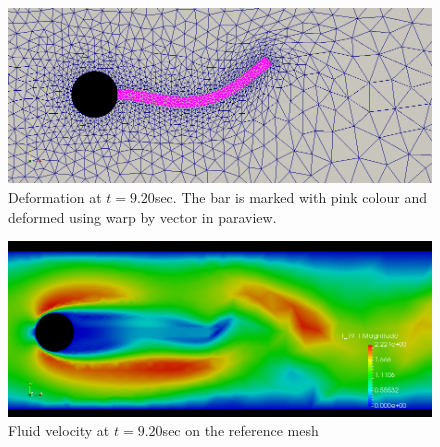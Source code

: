 \begin{figure}[H]
\includegraphics[scale=0.40,trim={0mm 0mm 0mm 0mm},clip]{./Verification_Validation/Hron_Turek/FSI2_d_920.png}
\caption{Deformation at $t =9.20 $sec. The bar is marked with pink colour and deformed using warp by vector in paraview.}
\end{figure}
\begin{figure}[H]
\includegraphics[scale=0.40,trim={0mm 0mm 0mm 0mm},clip]{./Verification_Validation/Hron_Turek/FSI2_u_920.png}
\caption{Fluid velocity at $ t = 9.20 $sec on the reference mesh}
\end{figure}

